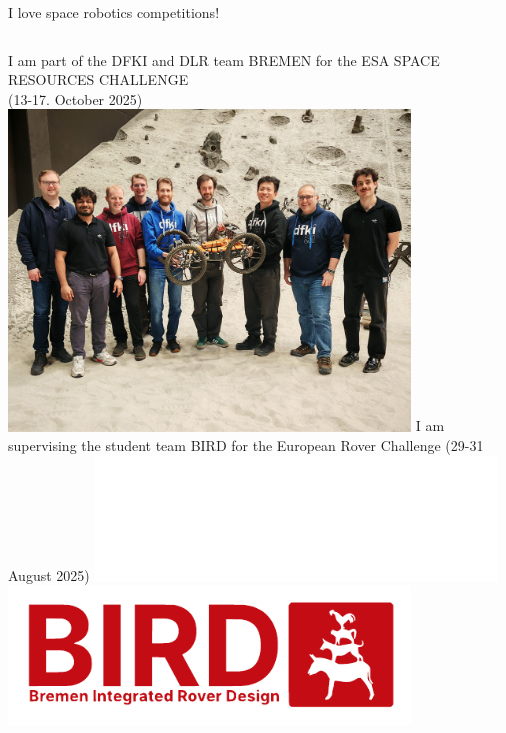 \documentclass[aspectratio=169]{beamer}
\begin{document}
\begin{frame}{I love space robotics competitions!}
  \begin{columns}
      \centering
      I am part of the DFKI and DLR team BREMEN for the
      ESA SPACE RESOURCES CHALLENGE\\ (13-17. October 2025)\\
      \includegraphics[width=0.8\textwidth]{figures/esasrc-team-bremen.jpg}
    \centering
      I am supervising the student team BIRD for the
      European Rover Challenge (29-31 August 2025)
      \includegraphics[width=0.8\textwidth]{figures/European-Rover-Challenge-logo.pdf}
      \includegraphics[width=0.8\textwidth]{figures/bird.pdf}
  \end{columns}
\end{frame}
\end{document}
